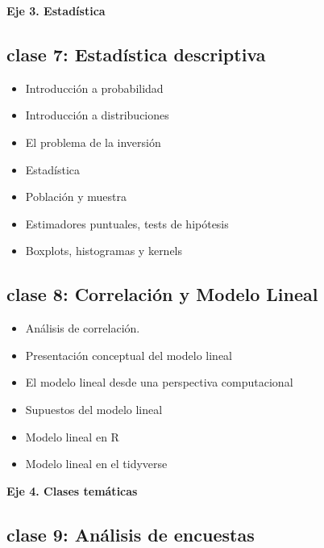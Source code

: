 \documentclass[]{book}
\providecommand{\tightlist}{%
  \setlength{\itemsep}{0pt}\setlength{\parskip}{0pt}}
\begin{document}
\textbf{Eje 3. Estadística}

\hypertarget{clase-7-estadistica-descriptiva}{%
\subsection{\texorpdfstring{\textbf{clase 7}: Estadística descriptiva}{clase 7: Estadística descriptiva}}\label{clase-7-estadistica-descriptiva}}

\begin{itemize}
\tightlist
\item
  Introducción a probabilidad
\item
  Introducción a distribuciones
\item
  El problema de la inversión
\item
  Estadística
\item
  Población y muestra
\item
  Estimadores puntuales, tests de hipótesis
\item
  Boxplots, histogramas y kernels
\end{itemize}

\hypertarget{clase-8-correlacion-y-modelo-lineal}{%
\subsection{\texorpdfstring{\textbf{clase 8}: Correlación y Modelo Lineal}{clase 8: Correlación y Modelo Lineal}}\label{clase-8-correlacion-y-modelo-lineal}}

\begin{itemize}
\tightlist
\item
  Análisis de correlación.
\item
  Presentación conceptual del modelo lineal
\item
  El modelo lineal desde una perspectiva computacional
\item
  Supuestos del modelo lineal
\item
  Modelo lineal en R
\item
  Modelo lineal en el tidyverse
\end{itemize}

\textbf{Eje 4. Clases temáticas}

\hypertarget{clase-9-analisis-de-encuestas}{%
\subsection{\texorpdfstring{\textbf{clase 9}: Análisis de encuestas}{clase 9: Análisis de encuestas}}\label{clase-9-analisis-de-encuestas}}
\end{document}
